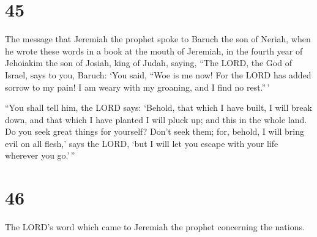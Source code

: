 \hypertarget{section-44}{%
\section{45}\label{section-44}}

 The message that Jeremiah the prophet spoke to Baruch the
son of Neriah, when he wrote these words in a book at the mouth of
Jeremiah, in the fourth year of Jehoiakim the son of Josiah, king of
Judah, saying,  ``The LORD, the God of Israel, says to
you, Baruch:  `You said, ``Woe is me now! For the LORD has
added sorrow to my pain! I am weary with my groaning, and I find no
rest.''\,'

 ``You shall tell him, the LORD says: `Behold, that which
I have built, I will break down, and that which I have planted I will
pluck up; and this in the whole land.  Do you seek great
things for yourself? Don't seek them; for, behold, I will bring evil on
all flesh,' says the LORD, `but I will let you escape with your life
wherever you go.'\,''

\hypertarget{section-45}{%
\section{46}\label{section-45}}

 The LORD's word which came to Jeremiah the prophet
concerning the nations.

